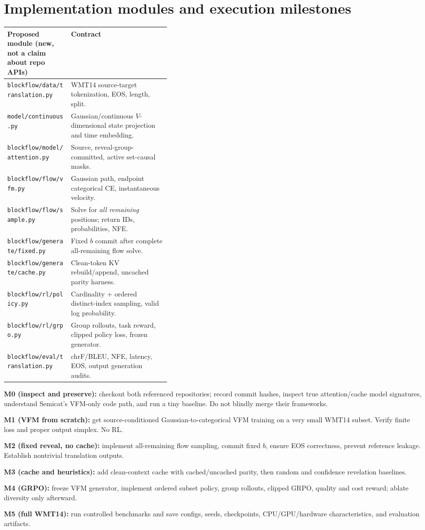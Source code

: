 \documentclass[11pt,a4paper]{article}
\begin{document}
\section{Implementation modules and execution milestones}
\begin{center}
\begin{tabularx}{\linewidth}{@{}p{0.39\linewidth}X@{}}\toprule
Proposed module (new, not a claim about repo APIs) & Contract \\ \midrule
\texttt{blockflow/data/translation.py} & WMT14 source-target tokenization, EOS, length, split. \\
\texttt{model/continuous.py} & Gaussian/continuous $V$-dimensional state projection and time embedding. \\
\texttt{blockflow/model/attention.py} & Source, reveal-group-committed, active set-causal masks. \\
\texttt{blockflow/flow/vfm.py} & Gaussian path, endpoint categorical CE, instantaneous velocity. \\
\texttt{blockflow/flow/sample.py} & Solve for \emph{all remaining} positions; return IDs, probabilities, NFE. \\
\texttt{blockflow/generate/fixed.py} & Fixed $b$ commit after complete all-remaining flow solve. \\
\texttt{blockflow/generate/cache.py} & Clean-token KV rebuild/append, uncached parity harness. \\
\texttt{blockflow/rl/policy.py} & Cardinality + ordered distinct-index sampling, valid log probability. \\
\texttt{blockflow/rl/grpo.py} & Group rollouts, task reward, clipped policy loss, frozen generator. \\
\texttt{blockflow/eval/translation.py} & chrF/BLEU, NFE, latency, EOS, output generation audits. \\ \bottomrule
\end{tabularx}
\end{center}
\textbf{M0 (inspect and preserve):} checkout both referenced repositories; record commit hashes, inspect true attention/cache model signatures, understand Semicat's VFM-only code path, and run a tiny baseline. Do not blindly merge their frameworks.\par
\textbf{M1 (VFM from scratch):} get source-conditioned Gaussian-to-categorical VFM training on a very small WMT14 subset. Verify finite loss and proper output simplex. No RL.\par
\textbf{M2 (fixed reveal, no cache):} implement all-remaining flow sampling, commit fixed $b$, ensure EOS correctness, prevent reference leakage. Establish nontrivial translation outputs.\par
\textbf{M3 (cache and heuristics):} add clean-context cache with cached/uncached parity, then random and confidence revelation baselines.\par
\textbf{M4 (GRPO):} freeze VFM generator, implement ordered subset policy, group rollouts, clipped GRPO, quality and cost reward; ablate diversity only afterward.\par
\textbf{M5 (full WMT14):} run controlled benchmarks and save configs, seeds, checkpoints, CPU/GPU/hardware characteristics, and evaluation artifacts.
\end{document}
